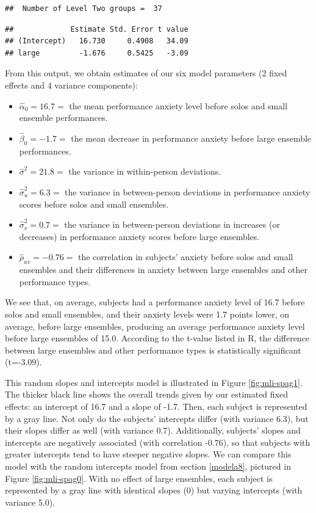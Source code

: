 \documentclass[
]{krantz}
\providecommand{\tightlist}{%
  \setlength{\itemsep}{0pt}\setlength{\parskip}{0pt}}
\begin{document}
\begin{verbatim}
##  Number of Level Two groups =  37
\end{verbatim}

\begin{verbatim}
##             Estimate Std. Error t value
## (Intercept)   16.730     0.4908   34.09
## large         -1.676     0.5425   -3.09
\end{verbatim}

From this output, we obtain estimates of our six model parameters (2 fixed effects and 4 variance components):

\begin{itemize}
\tightlist
\item
  \(\hat{\alpha}_{0}=16.7=\) the mean performance anxiety level before solos and small ensemble performances.
\item
  \(\hat{\beta}_{0}=-1.7=\) the mean decrease in performance anxiety before large ensemble performances.
\item
  \(\hat{\sigma}^2=21.8=\) the variance in within-person deviations.
\item
  \(\hat{\sigma}_{u}^{2}=6.3=\) the variance in between-person deviations in performance anxiety scores before solos and small ensembles.
\item
  \(\hat{\sigma}_{v}^{2}=0.7=\) the variance in between-person deviations in increases (or decreases) in performance anxiety scores before large ensembles.
\item
  \(\hat{\rho}_{uv}=-0.76=\) the correlation in subjects' anxiety before solos and small ensembles and their differences in anxiety between large ensembles and other performance types.
\end{itemize}

We see that, on average, subjects had a performance anxiety level of 16.7 before solos and small ensembles, and their anxiety levels were 1.7 points lower, on average, before large ensembles, producing an average performance anxiety level before large ensembles of 15.0. According to the t-value listed in R, the difference between large ensembles and other performance types is statistically significant (t=-3.09).

This random slopes and intercepts model is illustrated in Figure \ref{fig:mli-spag1}. The thicker black line shows the overall trends given by our estimated fixed effects: an intercept of 16.7 and a slope of -1.7. Then, each subject is represented by a gray line. Not only do the subjects' intercepts differ (with variance 6.3), but their slopes differ as well (with variance 0.7). Additionally, subjects' slopes and intercepts are negatively associated (with correlation -0.76), so that subjects with greater intercepts tend to have steeper negative slopes. We can compare this model with the random intercepts model from section \ref{modela8}, pictured in Figure \ref{fig:mli-spag0}. With no effect of large ensembles, each subject is represented by a gray line with identical slopes (0) but varying intercepts (with variance 5.0).
\end{document}
